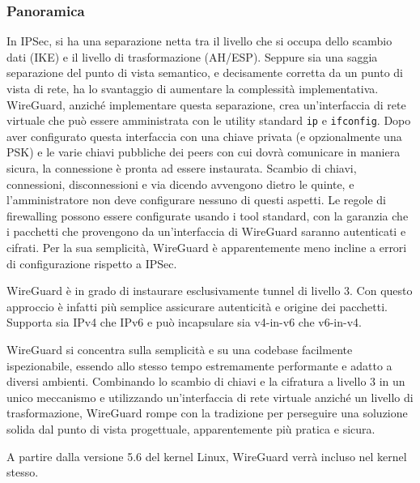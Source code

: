 \subsubsection{Panoramica}
In IPSec, si ha una separazione netta tra il livello che si occupa dello scambio dati (IKE) e il livello di trasformazione (AH/ESP). Seppure sia una saggia separazione del punto di vista semantico, e decisamente corretta da un punto di vista di rete, ha lo svantaggio di aumentare la complessità implementativa.
WireGuard, anziché implementare questa separazione, crea un'interfaccia di rete virtuale che può essere amministrata con le utility standard \texttt{ip} e \texttt{ifconfig}. Dopo aver configurato questa interfaccia con una chiave privata (e opzionalmente una PSK) e le varie chiavi pubbliche dei peers con cui dovrà comunicare in maniera sicura, la connessione è pronta ad essere instaurata. Scambio di chiavi, connessioni, disconnessioni e via dicendo avvengono dietro le quinte, e l'amministratore non deve configurare nessuno di questi aspetti.
Le regole di firewalling possono essere configurate usando i tool standard, con la garanzia che i pacchetti che provengono da un'interfaccia di WireGuard saranno autenticati e cifrati. Per la sua semplicità, WireGuard è apparentemente meno incline a errori di configurazione rispetto a IPSec.

WireGuard è in grado di instaurare esclusivamente tunnel di livello 3. Con questo approccio è infatti più semplice assicurare autenticità e origine dei pacchetti. Supporta sia IPv4 che IPv6 e può incapsulare sia v4-in-v6 che v6-in-v4.

WireGuard si concentra sulla semplicità e su una codebase facilmente ispezionabile, essendo allo stesso tempo estremamente performante e adatto a diversi ambienti. Combinando lo scambio di chiavi e la cifratura a livello 3 in un unico meccanismo e utilizzando un'interfaccia di rete virtuale anziché un livello di trasformazione, WireGuard rompe con la tradizione per perseguire una soluzione  solida dal punto di vista progettuale, apparentemente più pratica e sicura.

A partire dalla versione 5.6 del kernel Linux, WireGuard verrà incluso nel kernel stesso.
